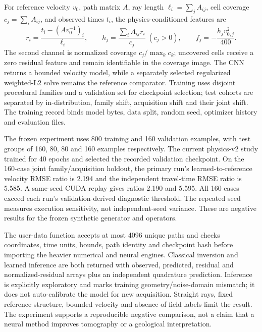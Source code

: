 For reference velocity \(v_0\), path matrix \(A\), ray length
\(\ell_i=\sum_jA_{ij}\), cell coverage \(c_j=\sum_iA_{ij}\), and
observed times \(t_i\), the physics-conditioned features are
\begin{equation}\label{eq:learned-velocity-features}
 r_i=\frac{t_i-(A v_0^{-1})_i}{\ell_i},\qquad
 h_j=\frac{\sum_iA_{ij}r_i}{c_j}\;(c_j>0),\qquad
 f_j=-\frac{h_j v_{0,j}^2}{400}.
\end{equation}
The second channel is normalized coverage \(c_j/\max_kc_k\); uncovered
cells receive a zero residual feature and remain identifiable in the
coverage image. The CNN returns a bounded velocity model, while a
separately selected regularized weighted-L2 solve remains the
reference comparator. Training uses disjoint procedural families and a
validation set for checkpoint selection; test cohorts are separated by
in-distribution, family shift, acquisition shift and their joint shift.
The training record binds model bytes, data split, random
seed, optimizer history and evaluation files.

The frozen experiment uses 800 training and 160 validation examples,
with test groups of 160, 80, 80 and 160 examples respectively. The
current physics-v2 study trained for 40 epochs and selected the recorded
validation checkpoint. On the 160-case joint family/acquisition holdout,
the primary run's learned-to-reference velocity RMSE ratio is 2.194 and
the independent travel-time RMSE ratio is 5.585. A same-seed CUDA replay
gives ratios 2.190 and 5.595. All 160 cases exceed each run's
validation-derived diagnostic threshold. The repeated seed measures
execution sensitivity, not independent-seed variance. These are
negative results for the frozen synthetic generator and operators.

The user-data function accepts at most 4096 unique paths and checks
coordinates, time units, bounds, path identity and checkpoint hash
before importing the heavier numerical and neural engines. Classical
inversion and learned inference are both returned with observed,
predicted, residual and normalized-residual arrays plus an independent
quadrature prediction. Inference is explicitly exploratory and marks
training geometry/noise-domain mismatch; it does not auto-calibrate the
model for new acquisition. Straight rays, fixed reference structure,
bounded velocity and absence of field labels limit the result. The
experiment supports a reproducible negative comparison, not a claim
that a neural method improves tomography or a geological interpretation.

